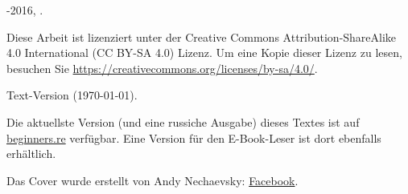 \begin{titlepage}


\end{titlepage}

\newpage

\begin{center}
\vspace*{\fill}
{\LARGE \TITLE}

\vspace*{\fill}

{\large \AUTHOR}

{\large \TT{<\EMAIL>}}
\vspace*{\fill}
\vfill

\ccbysa

-2016, \AUTHOR. 

Diese Arbeit ist lizenziert unter der Creative Commons Attribution-ShareAlike 4.0 International (CC BY-SA 4.0) Lizenz.
Um eine Kopie dieser Lizenz zu lesen, besuchen Sie \url{https://creativecommons.org/licenses/by-sa/4.0/}.

Text-Version ({\large \today}).

Die aktuellste Version (und eine russiche Ausgabe) dieses Textes ist auf \href{http://go.yurichev.com/17009}{beginners.re} verfügbar.
Eine Version für den E-Book-Leser ist dort ebenfalls erhältlich.

Das Cover wurde erstellt von Andy Nechaevsky: \href{http://go.yurichev.com/17023}{Facebook}.

\end{center}
